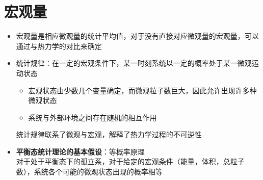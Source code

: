 \section{宏观量}

\begin{itemize}
    \item 宏观量是相应微观量的统计平均值，对于没有直接对应微观量的宏观量，可以通过与热力学的对比来确定
    \item 统计规律：在一定的宏观条件下，某一时刻系统以一定的概率处于某一微观运动状态
    \begin{itemize}
        \item 宏观状态由少数几个变量确定，而微观粒子数巨大，因此允许出现许多种微观状态
        \item 系统与外部环境之间存在随机的相互作用
    \end{itemize}
    统计规律联系了微观与宏观，解释了热力学过程的不可逆性
    \item \textbf{平衡态统计理论的基本假设}：等概率原理\\
    对于处于平衡态下的孤立系，对于给定的宏观条件（能量，体积，总粒子数），系统各个可能的微观状态出现的概率相等
\end{itemize}